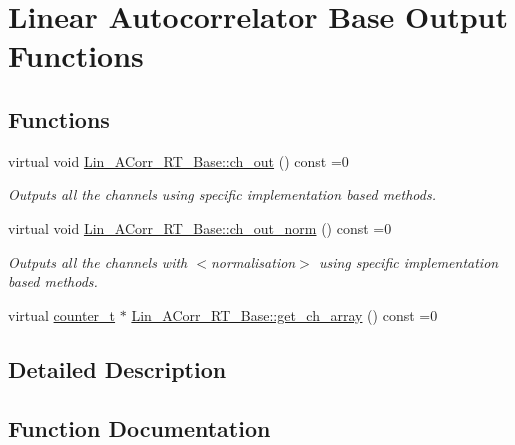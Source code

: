 \hypertarget{group__Lin__ACorr__Base__Out}{}\section{\textquotesingle{}\textquotesingle{}Linear Autocorrelator Base Output Functions\textquotesingle{}\textquotesingle{}}
\label{group__Lin__ACorr__Base__Out}
\subsection*{Functions}
\begin{DoxyCompactItemize}
\item 
virtual void \hyperlink{group__Lin__ACorr__Base__Out_ga4fe3bd7a6a98388d46827d22dc4596c9}{Lin\+\_\+\+A\+Corr\+\_\+\+R\+T\+\_\+\+Base\+::ch\+\_\+out} () const =0
\begin{DoxyCompactList}\small\item\em Outputs all the channels using specific implementation based methods. \end{DoxyCompactList}\item 
virtual void \hyperlink{group__Lin__ACorr__Base__Out_ga3e58cb03c3a93107758d506c53cf2461}{Lin\+\_\+\+A\+Corr\+\_\+\+R\+T\+\_\+\+Base\+::ch\+\_\+out\+\_\+norm} () const =0
\begin{DoxyCompactList}\small\item\em Outputs all the channels with {\bfseries } $<$normalisation$>$ using specific implementation based methods. \end{DoxyCompactList}\item 
virtual \hyperlink{types_8hpp_a22f279793847eba127de149437848c48}{counter\+\_\+t} $\ast$ \hyperlink{group__Lin__ACorr__Base__Out_gafb6585805776a54d5e4f120cfd1fea9e}{Lin\+\_\+\+A\+Corr\+\_\+\+R\+T\+\_\+\+Base\+::get\+\_\+ch\+\_\+array} () const =0
\end{DoxyCompactItemize}


\subsection{Detailed Description}


\subsection{Function Documentation}
\mbox{\label{group__Lin__ACorr__Base__Out_ga4fe3bd7a6a98388d46827d22dc4596c9}} 
